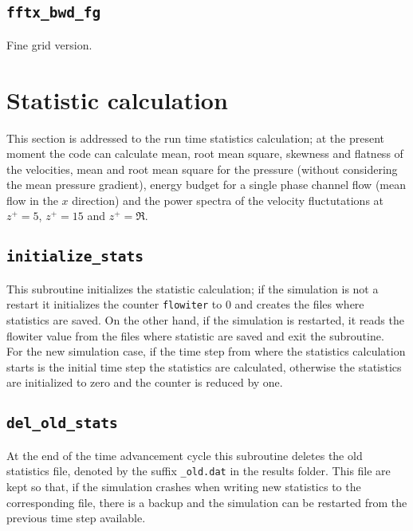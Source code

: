 \subsection{\texttt{fftx\_bwd\_fg}}
Fine grid version.




\section{Statistic calculation}
This section is addressed to the run time statistics calculation; at the present moment the code can calculate mean, root mean square, skewness and flatness of the velocities, mean and root mean square for the pressure (without considering the mean pressure gradient), energy budget for a single phase channel flow (mean flow in the $x$ direction) and the power spectra of the velocity fluctutations at $z^+=5$, $z^+=15$ and $z^+=\Re$.

\subsection{\texttt{initialize\_stats}}
This subroutine initializes the statistic calculation; if the simulation is not a restart it initializes the counter \texttt{flowiter} to 0 and creates the files where statistics are saved. On the other hand, if the simulation is restarted, it reads the flowiter value from the files where statistic are saved and exit the subroutine.\\
For the new simulation case, if the time step from where the statistics calculation starts is the initial time step the statistics are calculated, otherwise the statistics are initialized to zero and the counter is reduced by one.

\subsection{\texttt{del\_old\_stats}}
At the end of the time advancement cycle this subroutine deletes the old statistics file, denoted by the suffix \texttt{\_old.dat} in the results folder. This file are kept so that, if the simulation crashes when writing new statistics to the corresponding file, there is a backup and the simulation can be restarted from the previous time step available.

